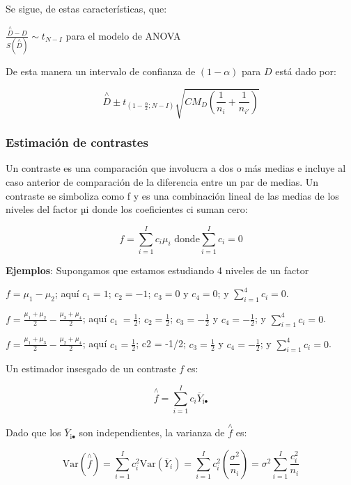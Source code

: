 \documentclass[]{book}
\theoremstyle{definition}
\theoremstyle{definition}
\theoremstyle{definition}
\theoremstyle{remark}
\begin{document}
Se sigue, de estas características, que:

\(\frac{\overset{\land}{D} - D}{S\left( \overset{\land}{D} \right)}\sim t_{N - I}\)
para el modelo de ANOVA

De esta manera un intervalo de confianza de \((1 - \alpha)\) para \(D\)
está dado por:

\[
\overset{\land}{D} \pm t_{\left( 1 - \frac{\alpha}{2};N - I \right)}\sqrt{CM_D\left( \frac{1}{n_{i}} + \frac{1}{n_{i'}} \right)}
\]

\hypertarget{estimacion-de-contrastes}{%
\subsubsection{Estimación de
contrastes}\label{estimacion-de-contrastes}}

Un contraste es una comparación que involucra a dos o más medias e
incluye al caso anterior de comparación de la diferencia entre un par de
medias. Un contraste se simboliza como f y es una combinación lineal de
las medias de los niveles del factor µi donde los coeficientes ci suman
cero:

\[
f = \sum_{i = 1}^{I}c_{i}\mu_{i}\text{ donde}\sum_{i = 1}^{I}c_{i} = 0
\]

\textbf{Ejemplos}: Supongamos que estamos estudiando 4 niveles de un
factor

\(f = \mu_{1} - \mu_{2}\); aquí \(c_{1} = 1\); \(c_{2} = - 1\);
\(c_{3} = 0\) y \(c_{4} = 0\); y \(\sum_{i = 1}^{4}c_{i} = 0\).

\(f = \frac{\mu_{1} + \mu_{2}}{2} - \frac{\mu_{3} + \mu_{4}}{2}\); aquí
\(c_{1}\
= \frac{1}{2}\); \(c_{2} = \frac{1}{2}\); \(c_{3} = - \frac{1}{2}\) y
\(c_{4} = - \frac{1}{2}\); y \(\sum_{i = 1}^{4}c_{i} = 0\).

\(f = \frac{\mu_{1} + \mu_{3}}{2} - \frac{\mu_{2} + \mu_{4}}{2}\); aquí
\(c_{1} = \frac{1}{2}\); c2 = -1/2; \(c_{3} = \frac{1}{2}\) y
\(c_{4} = - \frac{1}{2}\); y \(\sum_{i = 1}^{4}c_{i} = 0\).

Un estimador insesgado de un contraste \(f\) es:

\[
\overset{\land}{f} = \sum_{i = 1}^{I}c_{i}{\overline{Y}}_{\text{i}\bullet}
\]

Dado que los \({\overline{Y}}_{\text{i}\bullet}\) son independientes, la
varianza de \(\overset{\land}{f}\) es:

\[
\text{Var}\left( \overset{\land}{f} \right) = \sum_{i = 1}^{I}c_{i}^{2}\text{Var}\left( {\overline{Y}}_{i} \right) = \sum_{i = 1}^{I}c_{i}^{2}\left( \frac{\sigma^{2}}{n_{i}} \right) = \sigma^{2}\sum_{i = 1}^{I}\frac{c_{i}^{2}}{n_{i}}
\]
\end{document}
